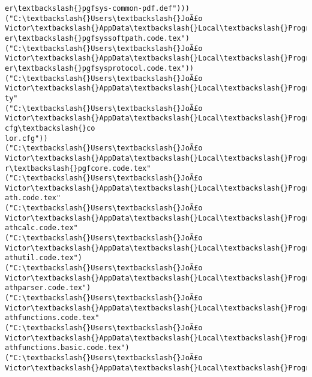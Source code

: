 \documentclass[11pt]{article}
\begin{document}
\begin{Verbatim}[commandchars=\\\{\}]
er\textbackslash{}pgfsys-common-pdf.def")))
("C:\textbackslash{}Users\textbackslash{}JoÃ£o Victor\textbackslash{}AppData\textbackslash{}Local\textbackslash{}Programs\textbackslash{}MiKTeX\textbackslash{}tex/generic/pgf/systemlay
er\textbackslash{}pgfsyssoftpath.code.tex")
("C:\textbackslash{}Users\textbackslash{}JoÃ£o Victor\textbackslash{}AppData\textbackslash{}Local\textbackslash{}Programs\textbackslash{}MiKTeX\textbackslash{}tex/generic/pgf/systemlay
er\textbackslash{}pgfsysprotocol.code.tex"))
("C:\textbackslash{}Users\textbackslash{}JoÃ£o Victor\textbackslash{}AppData\textbackslash{}Local\textbackslash{}Programs\textbackslash{}MiKTeX\textbackslash{}tex/latex/xcolor\textbackslash{}xcolor.s
ty"
("C:\textbackslash{}Users\textbackslash{}JoÃ£o Victor\textbackslash{}AppData\textbackslash{}Local\textbackslash{}Programs\textbackslash{}MiKTeX\textbackslash{}tex/latex/graphics-cfg\textbackslash{}co
lor.cfg"))
("C:\textbackslash{}Users\textbackslash{}JoÃ£o Victor\textbackslash{}AppData\textbackslash{}Local\textbackslash{}Programs\textbackslash{}MiKTeX\textbackslash{}tex/generic/pgf/basiclaye
r\textbackslash{}pgfcore.code.tex"
("C:\textbackslash{}Users\textbackslash{}JoÃ£o Victor\textbackslash{}AppData\textbackslash{}Local\textbackslash{}Programs\textbackslash{}MiKTeX\textbackslash{}tex/generic/pgf/math\textbackslash{}pgfm
ath.code.tex"
("C:\textbackslash{}Users\textbackslash{}JoÃ£o Victor\textbackslash{}AppData\textbackslash{}Local\textbackslash{}Programs\textbackslash{}MiKTeX\textbackslash{}tex/generic/pgf/math\textbackslash{}pgfm
athcalc.code.tex"
("C:\textbackslash{}Users\textbackslash{}JoÃ£o Victor\textbackslash{}AppData\textbackslash{}Local\textbackslash{}Programs\textbackslash{}MiKTeX\textbackslash{}tex/generic/pgf/math\textbackslash{}pgfm
athutil.code.tex")
("C:\textbackslash{}Users\textbackslash{}JoÃ£o Victor\textbackslash{}AppData\textbackslash{}Local\textbackslash{}Programs\textbackslash{}MiKTeX\textbackslash{}tex/generic/pgf/math\textbackslash{}pgfm
athparser.code.tex")
("C:\textbackslash{}Users\textbackslash{}JoÃ£o Victor\textbackslash{}AppData\textbackslash{}Local\textbackslash{}Programs\textbackslash{}MiKTeX\textbackslash{}tex/generic/pgf/math\textbackslash{}pgfm
athfunctions.code.tex"
("C:\textbackslash{}Users\textbackslash{}JoÃ£o Victor\textbackslash{}AppData\textbackslash{}Local\textbackslash{}Programs\textbackslash{}MiKTeX\textbackslash{}tex/generic/pgf/math\textbackslash{}pgfm
athfunctions.basic.code.tex")
("C:\textbackslash{}Users\textbackslash{}JoÃ£o Victor\textbackslash{}AppData\textbackslash{}Local\textbackslash{}Programs\textbackslash{}MiKTeX\textbackslash{}tex/generic/pgf/math\textbackslash{}pgfm

\end{Verbatim}
\end{document}
